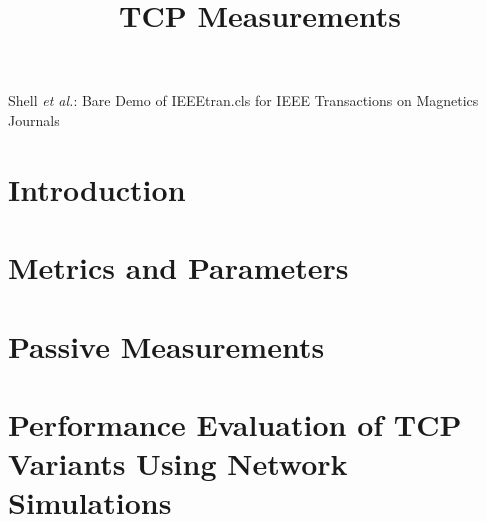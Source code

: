 \documentclass[journal,transmag]{IEEEtran}
\begin{document}
\title{TCP Measurements}

\author{
}

%
{Shell \MakeLowercase{\textit{et al.}}: Bare Demo of IEEEtran.cls for IEEE Transactions on Magnetics Journals}



\maketitle
\IEEEdisplaynontitleabstractindextext
\IEEEpeerreviewmaketitle

\section{Introduction}


\section{Metrics and Parameters}


\section{Passive Measurements}


\section{Performance Evaluation of TCP Variants Using Network Simulations}



\end{document}
